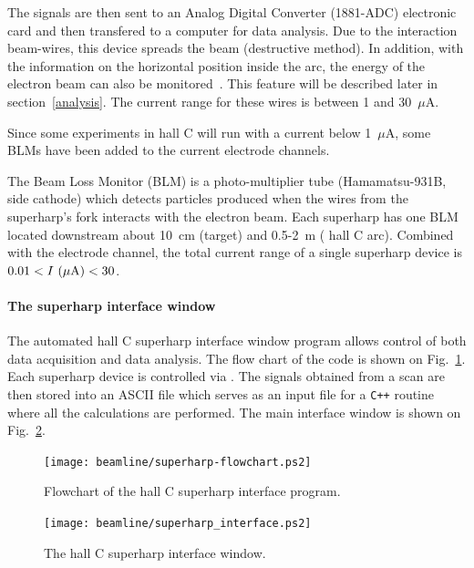The signals are then sent to an Analog Digital Converter (1881-ADC) electronic card and then transfered
to a computer for data analysis. Due to the interaction beam-wires, this device spreads the beam
(destructive method). In addition, with the information on the horizontal position inside the arc, the
energy of the electron beam can also be monitored~\cite{Gueye-98-energy}. This feature will be described
later in section~\ref{analysis}. The current range for these wires is
between 1 and 30~$\mu$A.  

Since some experiments in hall C will run with a current below
1~$\mu$A,  some BLMs have been added to the
current electrode channels.

The Beam Loss Monitor (BLM) is a photo-multiplier tube (Hamamatsu-931B, side cathode) which detects
particles produced when the wires from the superharp's fork interacts
with the  electron beam. Each
superharp has one BLM located downstream about 10~cm (target) and
0.5-2~m ( hall C arc). Combined with
the electrode channel, the total current range of a single superharp device is
$0.01 < I~(\mu {\rm A}) < 30$.

\paragraph{The superharp interface window}\label{interface}

The automated hall C superharp interface window program allows control of both
data acquisition and data analysis. The flow chart of the code is shown on Fig.~\ref{figure:flow_chart}. 
Each superharp device is controlled via 
. The
signals obtained from a scan are then
stored into an ASCII file which serves as an input file for a {\tt C++} routine where all the
calculations are performed. The main interface window is shown on Fig.~\ref{figure:interface}.

\begin{figure}[!hbt]
\begin{center}
\texttt{[image: beamline/superharp-flowchart.ps2]}
\caption{Flowchart of the hall C superharp interface program.}\label{figure:flow_chart}
\end{center}
\end{figure}

\begin{figure}[!hbt]
\begin{center}
\texttt{[image: beamline/superharp\_interface.ps2]}
\caption{The hall C superharp interface window.}\label{figure:interface}
\end{center}
\end{figure}

